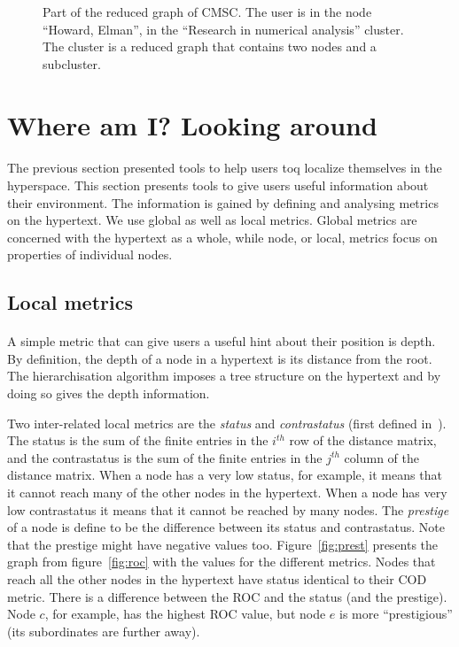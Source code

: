 \documentclass[twocolumn,10pt]{article}
\begin{document}
\begin{figure}
\vspace*{9cm}
\caption [10pt] { Part of the reduced graph of CMSC. The user is in the node
 ``Howard, Elman'', in the ``Research in numerical analysis'' cluster.
The cluster is a reduced graph that contains two nodes and a subcluster.}
\label{fig:reducedg}
\end{figure}

\section{Where am I? Looking around}
\paragraph{}
The previous section presented tools to help users toq localize themselves 
in the hyperspace. This section presents tools to give 
users useful information about their environment.
The information is gained by defining and analysing metrics on the
hypertext. We use global as well as local metrics.
Global metrics are concerned with the
hypertext as a whole, while node, or local, metrics focus on properties
of individual nodes.

\subsection*{Local metrics}
\paragraph{}
A simple metric that can give users a useful hint about their position
is depth. By definition, the depth of a node in a hypertext is its distance
from the root. The hierarchisation algorithm imposes a tree structure
on the hypertext and by doing so gives the depth information.

Two inter-related local metrics are the {\em status} and {\em
contrastatus} (first defined in~\cite{har59}). The status is the sum
of the finite entries in the $i^{th}$ row of the distance matrix, and
the contrastatus is the sum of the finite entries in the $j^{th}$
column of the distance matrix.  When a node has a very low status, for
example, it means that it cannot reach many of the other nodes in the
hypertext. When a node has very low contrastatus it means that it
cannot be reached by many nodes.  The {\em prestige} of a node is
define to be the difference between its status and contrastatus. Note
that the prestige might have negative values too.
Figure~\ref{fig:prest} presents the graph from figure~\ref{fig:roc}
with the values for the different metrics. Nodes that reach all the
other nodes in the hypertext have status identical to their COD
metric.  There is a difference between the ROC and the status (and the
prestige).  Node $c$, for example, has the highest ROC value, but node
$e$ is more ``prestigious'' (its subordinates are further away).
\end{document}
